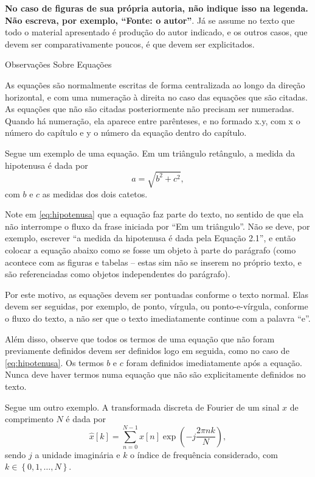 \documentclass[a4paper, 12pt]{ppgeb}
\makeatletter
\renewcommand{\section}{\@startsection
{section}
{1}
{0mm}
{-\baselineskip}
{0.5\baselineskip}
{\large\bfseries\scshape}}
\makeatother
\begin{document}
\textbf{No caso de figuras de sua própria autoria, não indique isso na legenda. Não escreva, por exemplo, ``Fonte: o autor''}. Já se assume no texto que todo o material apresentado é produção do autor indicado, e os outros casos, que devem ser comparativamente poucos, é que devem ser explicitados.

\section{Observações Sobre Equações}

As equações são normalmente escritas de forma centralizada ao longo da direção horizontal, e com uma numeração à direita no caso das equações que são citadas. As equações que não são citadas posteriormente não precisam ser numeradas. Quando há numeração, ela aparece entre parênteses, e no formado x.y, com x o número do capítulo e y o número da equação dentro do capítulo.

Segue um exemplo de uma equação. Em um triângulo retângulo, a medida da hipotenusa é dada por
\begin{equation}\label{eq:hipotenusa}
a = \sqrt{b^2 + c^2},
\end{equation}
com ${b}$ e ${c}$ as medidas dos dois catetos.

Note em \eqref{eq:hipotenusa} que a equação faz parte do texto, no sentido de que ela não interrompe o fluxo da frase iniciada por ``Em um triângulo''. Não se deve, por exemplo, escrever ``a medida da hipotenusa é dada pela Equação 2.1'', e então colocar a equação abaixo como se fosse um objeto à parte do parágrafo (como acontece com as figuras e tabelas -- estas sim não se inserem no próprio texto, e são referenciadas como objetos independentes do parágrafo).

Por este motivo, as equações devem ser pontuadas conforme o texto normal. Elas devem ser seguidas, por exemplo, de ponto, vírgula, ou ponto-e-vírgula, conforme o fluxo do texto, a não ser que o texto imediatamente continue com a palavra ``e''.

Além disso, observe que todos os termos de uma equação que não foram previamente definidos devem ser definidos logo em seguida, como no caso de \eqref{eq:hipotenusa}. Os termos ${b}$ e ${c}$ foram definidos imediatamente após a equação. Nunca deve haver termos numa equação que não são explicitamente definidos no texto.

Segue um outro exemplo. A transformada discreta de Fourier de um sinal ${x}$ de comprimento ${N}$ é dada por
\begin{equation}
\hat{x}[k]=\sum_{n=0}^{N-1}x[n]\exp\left(-j\frac{2\pi nk}{N}\right),
\end{equation}
sendo ${j}$ a unidade imaginária e ${k}$ o índice de frequência considerado, com ${k\in\left\{0,1,\ldots,N\right\}}$.
\end{document}
